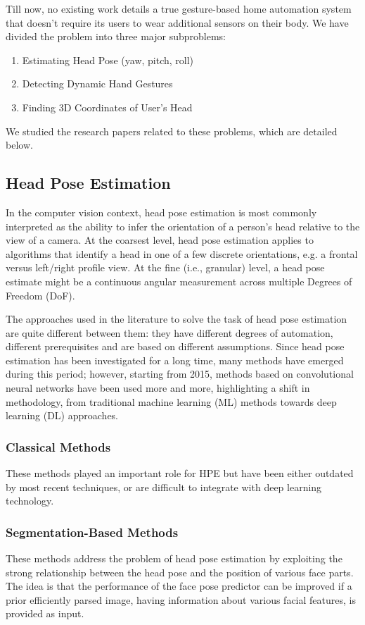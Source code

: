Till now, no existing work details a true gesture-based home automation system that doesn’t require its users to wear additional sensors on their body. We have divided the problem into three major subproblems:

\begin{enumerate}
	\item Estimating Head Pose (yaw, pitch, roll)
	\item Detecting Dynamic Hand Gestures
	\item Finding 3D Coordinates of User’s Head
\end{enumerate}

We studied the research papers related to these problems, which are detailed below.

\subsection{Head Pose Estimation}
In the computer vision context, head pose estimation is most commonly interpreted as the ability to infer the orientation of a person’s head relative to the view of a camera.
At the coarsest level, head pose estimation applies to algorithms that identify a head in one of a few discrete orientations, e.g. a frontal versus left/right profile view. At the fine (i.e., granular) level, a head pose estimate might be a continuous angular measurement across multiple Degrees of Freedom (DoF).

The approaches used in the literature to solve the task of head pose estimation are quite different between them: they have different degrees of automation, different prerequisites and are based on different assumptions. Since head pose estimation has been investigated for a long time, many methods have emerged during this period; however, starting from 2015, methods based on convolutional neural networks have been used more and more, highlighting a shift in methodology, from traditional machine learning (ML) methods towards deep learning (DL) approaches.

\subsubsection{Classical Methods}
These methods played an important role for HPE but have been either outdated by most recent techniques, or are difficult to integrate with deep learning technology.

\subsubsection{Segmentation-Based Methods}
These methods address the problem of head pose estimation by exploiting the strong relationship between the head pose and the position of various face parts. The idea is that the performance of the face pose predictor can be improved if a prior efficiently parsed image, having information about various facial features, is provided as input.

